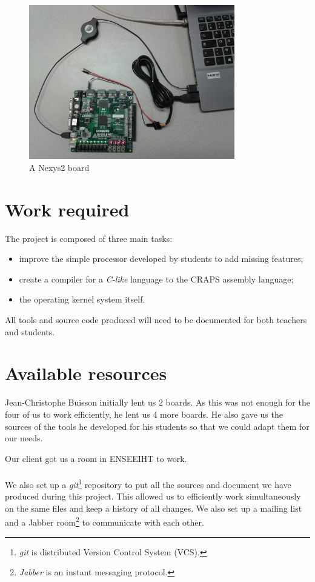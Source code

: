 \documentclass[openany, a4paper]{book}
\begin{document}
      \begin{figure}[h]
        \centering
        \includegraphics[width=0.8\textwidth]{./fig/Nexys2.jpg}
        \caption{A Nexys2 board}
      \end{figure}

    \section{Work required}
      The project is composed of three main tasks:
      \begin{itemize}
        \item improve the simple processor developed by students to add missing
          features;
        \item create a compiler for a \textit{C-like} language to the CRAPS
          assembly language;
        \item the operating kernel system itself.
      \end{itemize}

      All tools and source code produced will need to be documented for both
      teachers and students.

    \section{Available resources}
      Jean-Christophe Buisson initially lent us 2 boards. As this was not enough
      for the four of us to work efficiently, he lent us 4 more boards.
      He also gave us the sources of the tools he developed for his students so
      that we could adapt them for our needs.

      Our client got us a room in ENSEEIHT to work.

      \paragraph{}
      We also set up a \textit{git}\footnote{\textit{git} is distributed Version
      Control System (VCS).} repository to put all the sources and document we
      have produced during this project. This allowed us to efficiently work
      simultaneously on the same files and keep a history of all changes.
      We also set up a mailing list and a Jabber room\footnote{\textit{Jabber}
      is an instant messaging protocol.} to communicate with each other.
\end{document}
